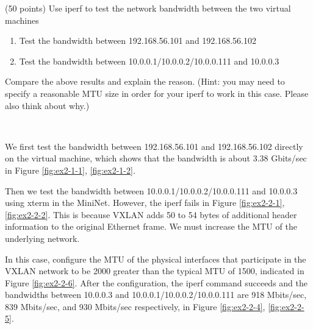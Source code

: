 \begin{exercise}[]{(50 points) Use iperf to test the network bandwidth between the two virtual machines
    \begin{enumerate}
        \item Test the bandwidth between 192.168.56.101 and 192.168.56.102
        \item Test the bandwidth between 10.0.0.1/10.0.0.2/10.0.0.111 and 10.0.0.3
    \end{enumerate}
    Compare the above results and explain the reason. (Hint: you may need to specify a reasonable MTU size in order for your iperf to work in this case. Please also think about why.)}
  \begin{solution}
  \par{~}

  We first test the bandwidth between 192.168.56.101 and 192.168.56.102 directly on the virtual machine, which shows that the bandwidth is about 3.38 Gbits/sec in Figure \ref{fig:ex2-1-1}, \ref{fig:ex2-1-2}.

  Then we test the bandwidth between 10.0.0.1/10.0.0.2/10.0.0.111 and 10.0.0.3 using xterm in the MiniNet. However, the iperf fails in Figure \ref{fig:ex2-2-1}, \ref{fig:ex2-2-2}. This is because VXLAN adds 50 to 54 bytes of additional header information to the original Ethernet frame. We must increase the MTU of the underlying network. 
  
  In this case, configure the MTU of the physical interfaces that participate in the VXLAN network to be 2000 greater than the typical MTU of 1500, indicated in Figure \ref{fig:ex2-2-6}. After the configuration, the iperf command succeeds and the bandwidths between 10.0.0.3 and 10.0.0.1/10.0.0.2/10.0.0.111 are 918 Mbits/sec, 839 Mbits/sec, and 930 Mbits/sec respectively, in Figure \ref{fig:ex2-2-4}, \ref{fig:ex2-2-5}.


\end{solution}
\end{exercise}
